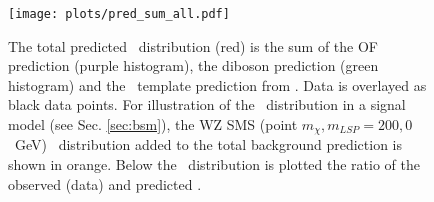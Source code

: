 



\begin{figure}[hbt]
  \begin{center}
	\texttt{[image: plots/pred\_sum\_all.pdf]}
	\caption{
	  \label{fig:pfmet_eemm}\protect 
	  The total predicted \MET\ distribution (red) is the sum of the 
	  OF prediction (purple histogram),
	  the diboson prediction (green histogram)
	  and the \MET\ template prediction from \gjets.
	  Data is overlayed as black data points.
	  For illustration of the \MET\ distribution in a signal model 
	  (see Sec. \ref{sec:bsm}), the WZ SMS (point $m_\chi,m_{LSP}=200,0$~GeV)
	  \MET\ distribution added to the total background prediction is shown in orange.
	  Below the \MET\ distribution is plotted the ratio of the observed (data)
	  and predicted \MET.
	}
  \end{center}
\end{figure}
